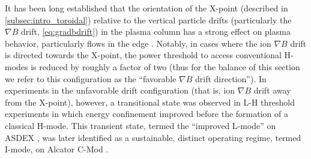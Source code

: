 It has been long established that the orientation of the X-point (described in \cref{subsec:intro_toroidal}) relative to the vertical particle drifts (particularly the $\nabla B$ drift, \cref{eq:gradbdrift}) in the plasma column has a strong effect on plasma behavior, particularly flows in the edge \cite{LaBombard2004,Fenzi2005,Hubbard2007,LaBombard2008}.  Notably, in cases where the ion $\nabla B$ drift is directed towards the X-point, the power threshold to access conventional H-modes is reduced by roughly a factor of two \cite{Carlstrom1998,Groebner1998,Suttrop2003} (thus for the balance of this section we refer to this configuration as the ``favorable $\nabla B$ drift direction'').  In experiments in the unfavorable drift configuration (that is, ion $\nabla B$ drift away from the X-point), however, a transitional state was observed in L-H threshold experiments in which energy confinement improved before the formation of a classical H-mode.  This transient state, termed the ``improved L-mode'' on ASDEX \cite{Ryter1998}, was later identified as a sustainable, distinct operating regime, termed I-mode, on Alcator C-Mod \cite{Whyte2010,McDermott2009a,Hubbard2011}.

\begin{figure}[t]
 \pushtooutside
\end{figure}

